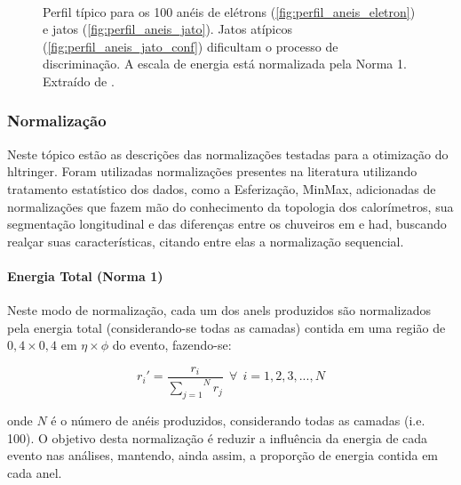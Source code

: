 \begin{figure}[ht!]
{  }\\
\caption[Perfil típico para os 100 anéis de elétrons e jatos.]{Perfil típico
para os 100 anéis de elétrons (\ref{fig:perfil_aneis_eletron}) e
jatos (\ref{fig:perfil_aneis_jato}). Jatos atípicos (\ref{fig:perfil_aneis_jato_conf}) 
dificultam o processo de discriminação. A escala de energia está normalizada
pela Norma 1. Extraído de \cite{tese_eduardo}.}
\end{figure}



\subsubsection{Normalização}
\label{sssec:preproc_norm}

Neste tópico estão as descrições das normalizações testadas para a otimização do
\gls{hltringer}. Foram utilizadas normalizações presentes na literatura
utilizando tratamento estatístico dos dados, como a Esferização, MinMax, 
adicionadas de normalizações que fazem mão do conhecimento da topologia dos calorímetros, 
sua segmentação longitudinal e das diferenças entre os chuveiros \gls{em} e \gls{had}, 
buscando realçar suas características, citando entre elas a normalização
sequencial.


\paragraph{Energia Total (Norma 1)}
\label{par:norm_norm1}

Neste modo de normalização, cada um dos \glspl{anel} produzidos são normalizados pela energia total 
(considerando-se todas as camadas) contida em uma região de $0,4 \times 0,4$ em 
$\eta \times \phi$ do evento, fazendo-se:

\begin{equation}
r_{i}' = \frac{r_i}{\overset{N}{\underset{j=1}{\sum}} r_j}~~\forall~~i=1,2,3,...,N
\end{equation}

\noindent onde $N$ é o número de anéis produzidos, considerando todas as camadas (i.e. 100). 
O objetivo desta normalização é reduzir a influência da energia de cada evento nas análises, 
mantendo, ainda assim, a proporção de energia contida em cada anel.

